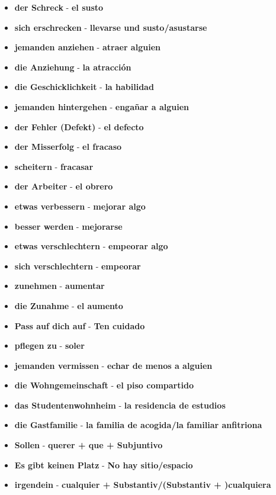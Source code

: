 \documentclass{article}
\begin{document}
\begin{multicols}{2}
\begin{itemize}
		\item{\textbf{der Schreck} - \textbf{el susto}}
		\item{\textbf{sich erschrecken} - \textbf{llevarse und susto/asustarse}}
		\item{\textbf{jemanden anziehen} - \textbf{atraer alguien}}
		\item{\textbf{die Anziehung} - \textbf{la atracción}}
		\item{\textbf{die Geschicklichkeit} - \textbf{la habilidad}}
		\item{\textbf{jemanden hintergehen} - \textbf{engañar a alguien}}
		\item{\textbf{der Fehler (Defekt)} - \textbf{el defecto}}
		\item{\textbf{der Misserfolg} - \textbf{el fracaso}}
		\item{\textbf{scheitern} - \textbf{fracasar}}
		\item{\textbf{der Arbeiter} - \textbf{el obrero}}
		\item{\textbf{etwas verbessern} - \textbf{mejorar algo}}
		\item{\textbf{besser werden} - \textbf{mejorarse}}
		\item{\textbf{etwas verschlechtern} - \textbf{empeorar algo}}
		\item{\textbf{sich verschlechtern} - \textbf{empeorar}}
		\item{\textbf{zunehmen} - \textbf{aumentar}}
		\item{\textbf{die Zunahme} - \textbf{el aumento}}
		\item{\textbf{Pass auf dich auf} - \textbf{Ten cuidado}}
		\item{\textbf{pflegen zu} - \textbf{soler}}
		\item{\textbf{jemanden vermissen} - \textbf{echar de menos a alguien}}
		\item{\textbf{die Wohngemeinschaft} - \textbf{el piso compartido}}
		\item{\textbf{das Studentenwohnheim} - \textbf{la residencia de estudios}}
		\item{\textbf{die Gastfamilie} - \textbf{la familia de acogida/la familiar anfitriona}}
		\item{\textbf{Sollen} - \textbf{querer + que + Subjuntivo}}
		\item{\textbf{Es gibt keinen Platz} - \textbf{No hay sitio/espacio}}
		\item{\textbf{irgendein} - \textbf{cualquier + Substantiv/(Substantiv + )cualquiera}}
	\end{itemize}

\end{multicols}
\end{document}
